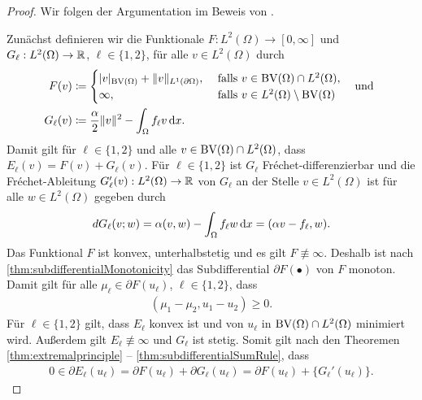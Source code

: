 \begin{proof}
  Wir folgen der Argumentation im Beweis von \cite[S. 304, Theorem 10.6]{Bar15}.

  Zunächst definieren wir die Funktionale $F: L^2(\Omega)\to
  [0,\infty]$ und $G_\ell:L^2(\Omega)\to \mathbb{R}$, $\ell\in\{1,2\}$, für
  alle $v\in L^2(\Omega)$ durch
  \begin{align*}
    F(v) 
    &\coloneqq 
    \begin{cases}
      |v|_{\textup{BV}(\Omega)} + \Vert v \Vert_{L^1(\partial\Omega)}, 
      &\text{ falls } v\in\textup{BV}(\Omega)\cap L^2(\Omega),\\
      \infty,&\text{ falls } v\in L^2(\Omega)\setminus\textup{BV}(\Omega)
    \end{cases}
    \quad\text{und }\\
    G_\ell(v)
    &\coloneqq 
    \frac{\alpha}{2}\Vert v\Vert^2 - \int_\Omega f_\ell v\,\mathrm{d}x.
  \end{align*}
  Damit gilt für $\ell\in\{1,2\}$ und alle
  $v\in\textup{BV}(\Omega)\cap L^2(\Omega)$, dass $E_\ell(v) =  F(v)+G_\ell(v)$.
  Für $\ell\in\{1,2\}$ ist $G_\ell$ Fr\'echet-differenzierbar und die
  Fr\'echet-Ableitung $G_\ell'(v): L^2(\Omega)\to\mathbb{R}$ von $G_\ell$ an der
  Stelle $v\in L^2(\Omega)$ ist für alle $w\in L^2(\Omega)$
  gegeben durch
  \begin{align*}
    dG_\ell(v;w) = \alpha (v,w) - \int_\Omega f_\ell w\,\mathrm{d}x 
    = (\alpha v-f_\ell ,w).
  \end{align*}
  Das Funktional $F$ ist konvex, unterhalbstetig und es gilt $F\nequiv\infty$.
  Deshalb ist nach \cref{thm:subdifferentialMonotonicity} das Subdifferential
  $\partial F(\bullet)$ von $F$ monoton. 
  Damit gilt für alle $\mu_\ell\in
  \partial F(u_\ell)$, $\ell\in\{1,2\}$, dass
  \begin{align}\label{eq:stabilityAndUniqueness:monotonicityOfSubdifferential}
    (\mu_1-\mu_2,u_1-u_2)\geq 0.
  \end{align}
  Für $\ell\in\{1,2\}$ gilt, dass $E_\ell$ konvex ist und von $u_\ell$ in
  $\textup{BV}(\Omega)\cap L^2(\Omega)$ minimiert wird. 
  Außerdem gilt $E_\ell\nequiv\infty$ und $G_\ell$ ist stetig.
  Somit gilt nach den Theoremen \ref{thm:extremalprinciple} --
  \ref{thm:subdifferentialSumRule}, dass
  \begin{align*}
    0\in\partial E_\ell(u_\ell) = \partial F(u_\ell)+\partial
    G_\ell(u_\ell)=\partial F(u_\ell)+ \{G_\ell'(u_\ell)\}.
  \end{align*}

\end{proof}

